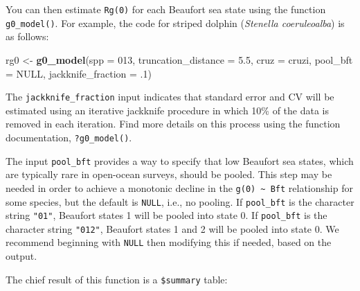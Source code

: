 \documentclass[
]{book}
\newenvironment{Shaded}{\begin{snugshade}}{\end{snugshade}}
\newcommand{\AttributeTok}[1]{\textcolor[rgb]{0.13,0.29,0.53}{#1}}
\newcommand{\ConstantTok}[1]{\textcolor[rgb]{0.56,0.35,0.01}{#1}}
\newcommand{\DecValTok}[1]{\textcolor[rgb]{0.00,0.00,0.81}{#1}}
\newcommand{\FloatTok}[1]{\textcolor[rgb]{0.00,0.00,0.81}{#1}}
\newcommand{\FunctionTok}[1]{\textcolor[rgb]{0.13,0.29,0.53}{\textbf{#1}}}
\newcommand{\NormalTok}[1]{#1}
\newcommand{\OtherTok}[1]{\textcolor[rgb]{0.56,0.35,0.01}{#1}}
\newcommand{\StringTok}[1]{\textcolor[rgb]{0.31,0.60,0.02}{#1}}
\begin{document}
You can then estimate \texttt{Rg(0)} for each Beaufort sea state using the function \texttt{g0\_model()}. For example, the code for striped dolphin (\emph{Stenella coeruleoalba}) is as follows:

\begin{Shaded}
\begin{Highlighting}[]
\NormalTok{rg0 }\OtherTok{\textless{}{-}} \FunctionTok{g0\_model}\NormalTok{(}\AttributeTok{spp =} \StringTok{\textquotesingle{}013\textquotesingle{}}\NormalTok{,}
                \AttributeTok{truncation\_distance =} \FloatTok{5.5}\NormalTok{,}
                \AttributeTok{cruz =}\NormalTok{ cruzi,}
                \AttributeTok{pool\_bft =} \ConstantTok{NULL}\NormalTok{,}
                \AttributeTok{jackknife\_fraction =}\NormalTok{ .}\DecValTok{1}\NormalTok{)}
\end{Highlighting}
\end{Shaded}

The \texttt{jackknife\_fraction} input indicates that standard error and CV will be estimated using an iterative jackknife procedure in which 10\% of the data is removed in each iteration. Find more details on this process using the function documentation, \texttt{?g0\_model()}.

The input \texttt{pool\_bft} provides a way to specify that low Beaufort sea states, which are typically rare in open-ocean surveys, should be pooled. This step may be needed in order to achieve a monotonic decline in the \texttt{g(0)\ \textasciitilde{}\ Bft} relationship for some species, but the default is \texttt{NULL}, i.e., no pooling. If \texttt{pool\_bft} is the character string \texttt{"01"}, Beaufort states 1 will be pooled into state 0. If \texttt{pool\_bft} is the character string \texttt{"012"}, Beaufort states 1 and 2 will be pooled into state 0. We recommend beginning with \texttt{NULL} then modifying this if needed, based on the output.

The chief result of this function is a \texttt{\$summary} table:
\end{document}
